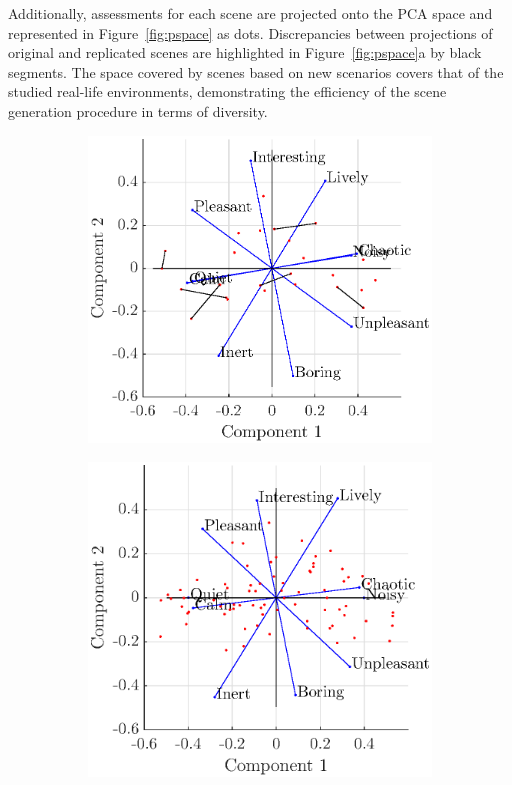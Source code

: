 \documentclass[11pt,a4paper]{article}
\begin{document}
Additionally, assessments for each scene are projected onto the PCA space and represented in Figure~\ref{fig:pspace} as dots. Discrepancies between projections of original and replicated scenes are highlighted in Figure~\ref{fig:pspace}a by black segments. The space covered by scenes based on new scenarios covers that of the studied real-life environments, demonstrating the efficiency of the scene generation procedure in terms of diversity.

\begin{figure}[h]
    \centering
     \begin{subfigure}[t]{0.5\textwidth}
        \centering
        \includegraphics[width=\textwidth]{figures/pca_rep.eps}
    \end{subfigure}%
    \begin{subfigure}[t]{0.5\textwidth}
        \centering
        \includegraphics[width=\textwidth]{figures/pca_sim.eps}

\end{subfigure}
\end{figure}
\end{document}
